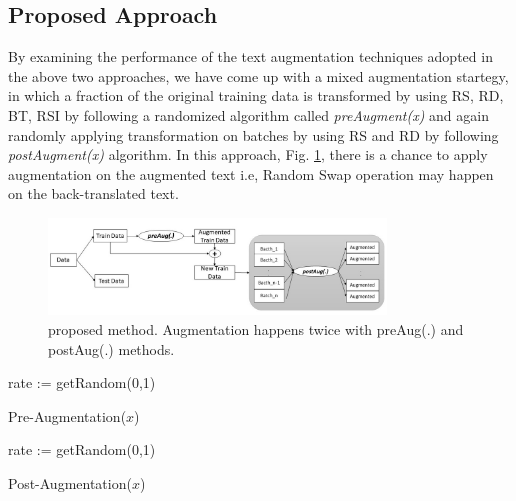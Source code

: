 \documentclass{article}
\begin{document}
\subsection{Proposed Approach}
By examining the performance of the text augmentation techniques adopted in the above two approaches, we have come up with a mixed augmentation startegy, in which a fraction of the original training data is transformed by using RS, RD, BT, RSI by following a randomized algorithm called \textit{preAugment(x)} and again randomly applying transformation on batches by using RS and RD by following \textit{postAugment(x)} algorithm. In this approach, Fig. \ref{fig:proposedapproach}, there is a chance to apply augmentation on the augmented text i.e, Random Swap operation may happen on the back-translated text.

\begin{figure}[h!]
\centering
  \includegraphics[width=0.8\textwidth]{proposedmethod.jpg}
  \caption{proposed method. Augmentation happens twice with preAug(.) and postAug(.) methods.}
  \label{fig:proposedapproach}
\end{figure}

\begin{algorithm}[H]
\SetAlgoLined
{}
rate := getRandom(0,1) 
\caption{Pre-Augmentation($x$)}
\end{algorithm}


\begin{algorithm}[H]
\SetAlgoLined
{}
rate := getRandom(0,1)    
\caption{Post-Augmentation($x$)}
\end{algorithm}
\end{document}
